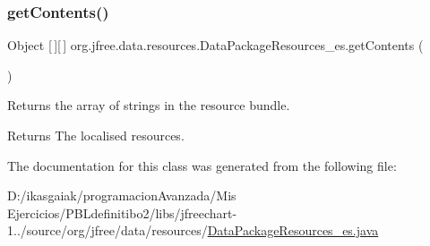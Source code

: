 \subsubsection{\texorpdfstring{get\+Contents()}{getContents()}}
{\footnotesize\ttfamily Object \mbox{[}$\,$\mbox{]}\mbox{[}$\,$\mbox{]} org.\+jfree.\+data.\+resources.\+Data\+Package\+Resources\+\_\+es.\+get\+Contents (\begin{DoxyParamCaption}{ }\end{DoxyParamCaption})}

Returns the array of strings in the resource bundle.

\begin{DoxyReturn}{Returns}
The localised resources. 
\end{DoxyReturn}


The documentation for this class was generated from the following file\+:\begin{DoxyCompactItemize}
\item 
D\+:/ikasgaiak/programacion\+Avanzada/\+Mis Ejercicios/\+P\+B\+Ldefinitibo2/libs/jfreechart-\/1../source/org/jfree/data/resources/\mbox{\hyperlink{_data_package_resources__es_8java}{Data\+Package\+Resources\+\_\+es.\+java}}\end{DoxyCompactItemize}
